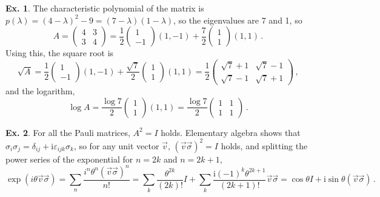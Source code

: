 \documentclass[a4paper,12pt]{article}
\def\imagi{\mathrm{i}}
\theoremstyle{definition}
\newtheorem{exercise}{Ex.}[section]
\begin{document}
\begin{exercise}
 The characteristic polynomial of the matrix is $p(\lambda)=(4-\lambda)^2-9=(7-\lambda)(1-\lambda)$, so the eigenvalues are 7 and 1, so
 \[
  A = \begin{pmatrix} 4 & 3 \\ 3 & 4\end{pmatrix}
  = \frac{1}{2}\begin{pmatrix} 1 \\ -1\end{pmatrix} (1, -1) + \frac{7}{2}\begin{pmatrix} 1 \\ 1\end{pmatrix} (1, 1)\,.
 \]
 Using this, the square root is
 \[
  \sqrt{A} = \frac{1}{2}\begin{pmatrix} 1 \\ -1\end{pmatrix} (1, -1) + \frac{\sqrt{7}}{2}\begin{pmatrix} 1 \\ 1\end{pmatrix} (1, 1) = \frac{1}{2}\begin{pmatrix} \sqrt{7}+1 & \sqrt{7}-1\\ \sqrt{7}-1 & \sqrt{7}+1\end{pmatrix}\,,
 \]
and the logarithm,
\[
 \log A = \frac{\log 7}{2} \begin{pmatrix} 1 \\ 1\end{pmatrix} (1, 1) = \frac{\log 7}{2}\begin{pmatrix} 1 & 1 \\ 1 & 1 \end{pmatrix}\,.
\]
\end{exercise}

\begin{exercise}\label{ex:PauliExponential}
 For all the Pauli matrices, $A^2=I$ holds. Elementary algebra shows that $\sigma_i\sigma_j = \delta_{ij} + \imagi\varepsilon_{ijk}\sigma_k$, so for any unit vector $\vec{v}$, $(\vec{v}\vec{\sigma})^2=I$ holds, and splitting the power series of the exponential for $n=2k$ and $n=2k+1$,
 \[
  \exp(i\theta \vec{v}\vec{\sigma})=\sum_n \frac{i^n \theta^n (\vec{v}\vec{\sigma})^n}{n!} = \sum_k \frac{\theta^{2k}}{(2k)!}I + \sum_k \frac{\imagi (-1)^{k}\theta^{2k+1}}{(2k+1)!}\vec{v}\vec{\sigma}=\cos\theta I + \imagi \sin\theta (\vec{v}\vec{\sigma})\,.
 \]
\end{exercise}
\end{document}
